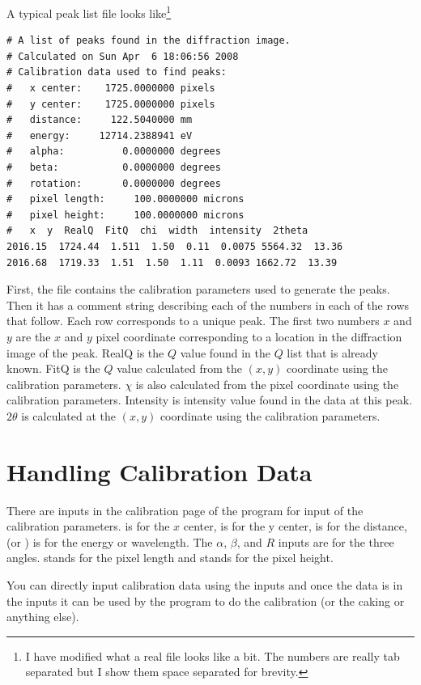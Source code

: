 A typical peak list file looks like\footnote{I have modified
what a real file looks like a bit. The numbers are really tab 
separated but I show them space separated for brevity.}
\begin{lstlisting}[caption={A Peak List File,basicstyle=\ttfamily\tiny}]
# A list of peaks found in the diffraction image.
# Calculated on Sun Apr  6 18:06:56 2008
# Calibration data used to find peaks:
#   x center:    1725.0000000 pixels
#   y center:    1725.0000000 pixels
#   distance:     122.5040000 mm
#   energy:     12714.2388941 eV
#   alpha:          0.0000000 degrees
#   beta:           0.0000000 degrees
#   rotation:       0.0000000 degrees
#   pixel length:     100.0000000 microns
#   pixel height:     100.0000000 microns
#   x  y  RealQ  FitQ  chi  width  intensity  2theta
2016.15  1724.44  1.511  1.50  0.11  0.0075 5564.32  13.36
2016.68  1719.33  1.51  1.50  1.11  0.0093 1662.72  13.39
\end{lstlisting}
First, the file contains the calibration parameters
used to generate the peaks. Then it has a comment string
describing each of the numbers in each of the rows
that follow. Each row corresponds to a unique peak.
The first two numbers $x$ and $y$ are
the $x$ and $y$ pixel coordinate corresponding to
a location in the diffraction image of the peak. RealQ 
is the $Q$ value found in the $Q$ list that is already 
known. FitQ is the $Q$ value calculated 
from the $(x,y)$ coordinate using the calibration
parameters. $\chi$ is also calculated from the pixel
coordinate using the calibration parameters. 
Intensity is intensity value found in the data at
this peak. $2\theta$ is calculated at the $(x,y)$ 
coordinate using the calibration parameters.

\section{Handling Calibration Data}

There are inputs in the calibration page of the
program for input of the calibration parameters.
 is for the $x$ center,  is
for the y center,  is for the distance,
 (or \gui{$\lambda$:}) is for the energy
or wavelength. The $\alpha$, $\beta$, and
$R$ inputs are for the three angles. 
 stands for the pixel length
and  stands for the pixel height.

You can directly input calibration data using 
the inputs and once the data is in the inputs
it can be used by the program to do the calibration
(or the caking or anything else).


